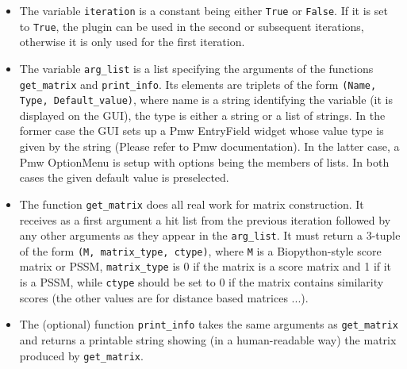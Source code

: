 \documentclass[11pt]{article}
\begin{document}
\begin{itemize}
\item The variable \texttt{iteration} is a constant being either \texttt{True} or \texttt{False}. If it is set to \texttt{True}, the plugin can be used in the second or subsequent iterations, otherwise it is only used for the first iteration.

\item The variable \texttt{arg\_list} is a list specifying the arguments of the functions \texttt{get\_matrix} and \texttt{print\_info}. Its elements are triplets of the form \texttt{(Name, Type, Default\_value)}, where name is a string identifying the variable (it is displayed on the GUI), the type is either a string or a list of strings. In the former case the GUI sets up a Pmw EntryField widget whose value type is given by the string (Please refer to Pmw documentation). In the latter case, a Pmw OptionMenu is setup with options being the members of lists. In both cases the given default value is preselected.

\item The function \texttt{get\_matrix} does all real work for matrix construction. It receives as a first argument a hit list from the previous iteration followed by any other arguments as they appear in the \texttt{arg\_list}. It must return a 3-tuple of the form \texttt{(M, matrix\_type, ctype)}, where \texttt{M} is a Biopython-style score matrix or PSSM, \texttt{matrix\_type} is 0 if the matrix is a score matrix and 1 if it is a PSSM, while \texttt{ctype} should be set to 0 if the matrix contains similarity scores (the other values are for distance based matrices ...).

\item The (optional) function \texttt{print\_info} takes the same arguments as \texttt{get\_matrix} and returns a printable string showing (in a human-readable way) the matrix produced by \texttt{get\_matrix}.

\end{itemize}
\end{document}
